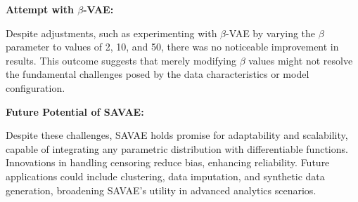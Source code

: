 \documentclass{article}
\begin{document}
\textbf{Attempt with \(\beta\)-VAE:}

Despite adjustments, such as experimenting with \(\beta\)-VAE by varying the \(\beta\) parameter to values of 2, 10, and 50, there was no noticeable improvement in results. This outcome suggests that merely modifying \(\beta\) values might not resolve the fundamental challenges posed by the data characteristics or model configuration.

\textbf{Future Potential of SAVAE:}

Despite these challenges, SAVAE holds promise for adaptability and scalability, capable of integrating any parametric distribution with differentiable functions. Innovations in handling censoring reduce bias, enhancing reliability. Future applications could include clustering, data imputation, and synthetic data generation, broadening SAVAE’s utility in advanced analytics scenarios.







  

\cleardoublepage
\end{document}
